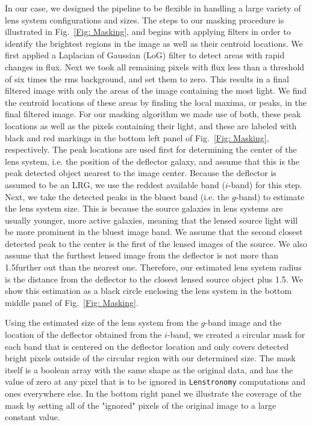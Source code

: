 \documentclass[tradiabstract,twocolumn]{aa}
\begin{document}
In our case, we designed the pipeline to be flexible in handling a large variety of lens system configurations and sizes. The steps to our masking procedure is illustrated in Fig.~\ref{Fig: Masking}, and begins with applying filters in order to identify the brightest regions in the image as well as their centroid locations. We first applied a Laplacian of Gaussian (LoG) filter to detect areas with rapid changes in flux. Next we took all remaining pixels with flux less than a threshold of six times the rms background, and set them to zero. This results in a final filtered image with only the areas of the image containing the most light. We find the centroid locations of these areas by finding the local maxima, or peaks, in the final filtered image. For our masking algorithm we made use of both, these peak locations as well as the pixels containing their light, and these are labeled with black and red markings in the bottom left panel of Fig.~\ref{Fig: Masking}, respectively. The peak locations are used first for determining the center of the lens system, i.e. the position of the deflector galaxy, and assume that this is the peak detected object nearest to the image center. Because the deflector is assumed to be an LRG, we use the reddest available band ($i$-band) for this step. Next, we take the detected peaks in the bluest band (i.e. the $g$-band) to estimate the lens system size. This is because the source galaxies in lens systems are usually younger, more active galaxies, meaning that the lensed source light will be more prominent in the bluest image band. We assume that the second closest detected peak to the center is the first of the lensed images of the source. We also assume that the furthest lensed image from the deflector is not more than 1.5\arcsec further out than the nearest one. Therefore, our estimated lens system radius is the distance from the deflector to the closest lensed source object plus 1.5\arcsec. We show this estimation as a black circle enclosing the lens system in the bottom middle panel of Fig.~\ref{Fig: Masking}.

Using the estimated size of the lens system from the $g$-band image and the location of the deflector obtained from the $i$-band, we created a circular mask for each band that is centered on the deflector location and only covers detected bright pixels outside of the circular region with our determined size. The mask itself is a boolean array with the same shape as the original data, and has the value of zero at any pixel that is to be ignored in {\tt Lenstronomy} computations and ones everywhere else. In the bottom right panel we illustrate the coverage of the mask by setting all of the "ignored" pixels of the original image to a large constant value. 
\end{document}
